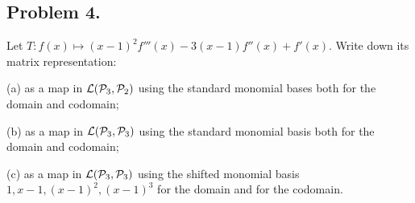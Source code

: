 \documentclass{article}
\begin{document}
\newpage
\subsection*{Problem 4.}
Let $T :  f(x)\mapsto (x-1)^2f'''(x)-3(x-1)f''(x)+f'(x)$. Write down its matrix representation:
\begin{description}
\item{(a)} as a map in ${\cal L}({\cal P}_3,{\cal P}_2)$ using the standard monomial bases both for 
the domain and codomain;
\item{(b)} as a map in ${\cal L}({\cal P}_3, {\cal P}_3)$ using the standard monomial basis both 
for the domain and codomain;
\item{(c)} as a map in ${\cal L}({\cal P}_3 , {\cal P}_3)$ using the shifted monomial basis 
$1, x-1, (x-1)^2, (x-1)^3$ for the domain and  for the codomain.
\end{description}
\end{document}
